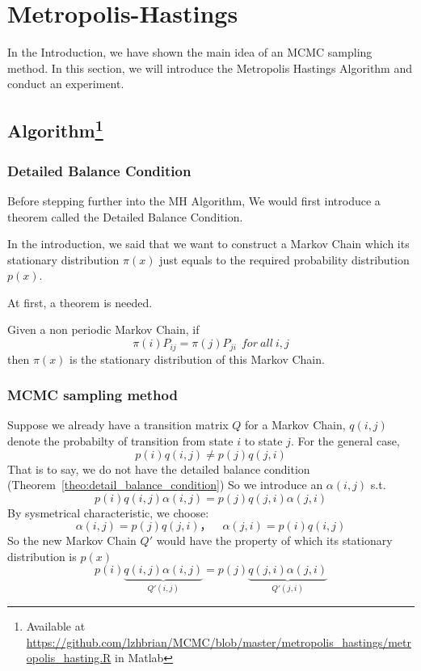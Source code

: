 
\section{Metropolis-Hastings} \label{sec:metropolis_hastings}
In the Introduction, we have shown the main idea of an MCMC sampling method. In this section, we will introduce the Metropolis Hastings Algorithm and conduct an experiment.

\subsection{Algorithm\protect\footnote{Available at \protect\url{https://github.com/lzhbrian/MCMC/blob/master/metropolis_hastings/metropolis_hasting.R} in Matlab}}

\subsubsection{Detailed Balance Condition}
Before stepping further into the MH Algorithm, We would first introduce a theorem called the Detailed Balance Condition. 

In the introduction, we said that we want to construct a Markov Chain which its stationary distribution $\pi(x)$ just equals to the required probability distribution $p(x)$.

At first, a theorem is needed.
\begin{theorem} \label{theo:detail_balance_condition}
Given a non periodic Markov Chain, if 
\begin{equation} 
\pi(i) P_{ij} = \pi(j) P_{ji}~~for~all~i,j 
\end{equation}
then $\pi(x)$ is the stationary distribution of this Markov Chain.
\end{theorem}

\subsubsection{MCMC sampling method}
Suppose we already have a transition matrix $Q$ for a Markov Chain, $q(i,j)$ denote the probabilty of transition from state $i$ to state $j$. For the general case, 
$$p(i) q(i,j) \neq p(j) q(j,i)$$
That is to say, we do not have the detailed balance condition (Theorem~\ref{theo:detail_balance_condition})
So we introduce an $\alpha(i,j)$ s.t.
\begin{equation} 
p(i) q(i,j)\alpha(i,j) = p(j) q(j,i)\alpha(j,i) 
\end{equation}
By sysmetrical characteristic, we choose:
\begin{equation} 
\alpha(i,j)= p(j) q(j,i)， \quad \alpha(j,i) = p(i) q(i,j)
\end{equation}
So the new Markov Chain $Q'$ would have the property of which its stationary distribution is $p(x)$
\begin{equation}
\label{detailed-balance} 
p(i) \underbrace{q(i,j)\alpha(i,j)}_{Q'(i,j)} 
= p(j) \underbrace{q(j,i)\alpha(j,i)}_{Q'(j,i)}
\end{equation}

